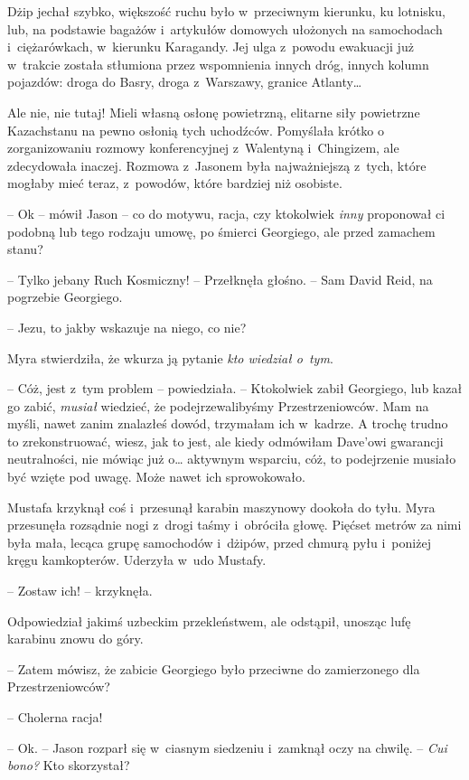 \documentclass[oneside,polish,11pt,sfheadings]{mwbk}
\begin{document}
Dżip jechał szybko, większość ruchu było w~przeciwnym kierunku, ku
lotnisku, lub, na podstawie bagażów i~artykułów domowych ułożonych na
samochodach i~ciężarówkach, w~kierunku Karagandy. Jej ulga z~powodu
ewakuacji już w~trakcie została stłumiona przez wspomnienia innych dróg,
innych kolumn pojazdów: droga do Basry, droga z~Warszawy, granice
Atlanty\ldots

Ale nie, nie tutaj! Mieli własną osłonę powietrzną, elitarne siły
powietrzne Kazachstanu na pewno osłonią tych uchodźców. Pomyślała krótko
o zorganizowaniu rozmowy konferencyjnej z~Walentyną i~Chingizem, ale
zdecydowała inaczej. Rozmowa z~Jasonem była najważniejszą z~tych, które
mogłaby mieć teraz, z~powodów, które bardziej niż osobiste.

-- Ok -- mówił Jason -- co do motywu, racja, czy ktokolwiek \textit{inny}
proponował ci podobną lub tego rodzaju umowę, po śmierci Georgiego, ale
przed zamachem stanu?

-- Tylko jebany Ruch Kosmiczny! -- Przełknęła głośno. -- Sam David Reid, na
pogrzebie Georgiego.

-- Jezu, to jakby wskazuje na niego, co nie?

Myra stwierdziła, że wkurza ją pytanie \textit{kto wiedział o~tym}.

-- Cóż, jest z~tym problem -- powiedziała. -- Ktokolwiek zabił Georgiego,
lub kazał go zabić, \textit{musiał} wiedzieć, że podejrzewalibyśmy
Przestrzeniowców. Mam na myśli, nawet zanim znalazłeś dowód, trzymałam
ich w~kadrze. A trochę trudno to zrekonstruować, wiesz, jak to jest, ale
kiedy odmówiłam Dave'owi gwarancji neutralności, nie mówiąc już o\ldots
aktywnym wsparciu, cóż, to podejrzenie musiało być wzięte pod uwagę.
Może nawet ich sprowokowało.

Mustafa krzyknął coś i~przesunął karabin maszynowy dookoła do tyłu. Myra
przesunęła rozsądnie nogi z~drogi taśmy i~obróciła głowę. Pięćset metrów
za nimi była mała, lecąca grupę samochodów i~dżipów, przed chmurą pyłu i~poniżej kręgu kamkopterów. Uderzyła w~udo Mustafy.

-- Zostaw ich! -- krzyknęła.

Odpowiedział jakimś uzbeckim przekleństwem, ale odstąpił, unosząc lufę
karabinu znowu do góry.

-- Zatem mówisz, że zabicie Georgiego było przeciwne do zamierzonego dla
Przestrzeniowców?

-- Cholerna racja!

-- Ok. -- Jason rozparł się w~ciasnym siedzeniu i~zamknął oczy na chwilę.
-- \textit{Cui bono?} Kto skorzystał?
\end{document}
